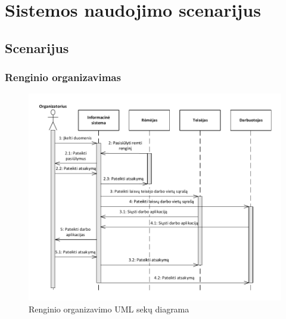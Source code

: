 \documentclass{VUMIFPSkursinis}
\begin{document}
\section{Sistemos naudojimo scenarijus} \label{sistemosNaudojimoScenarijus}
  \subsection{Scenarijus} \label{sistemosNaudojimoScenarijus_scenarijus}
    \subsubsection*{Renginio organizavimas}
	    \begin{figure}[H]
        \centering
        \includegraphics[width=\textwidth]{img/ScenarijausSekuDiagrama1}
        \caption{Renginio organizavimo UML sekų diagrama}
        \label{fig:scenarijusOrganizavimoSekuDiagrama}
      \end{figure}
\end{document}
